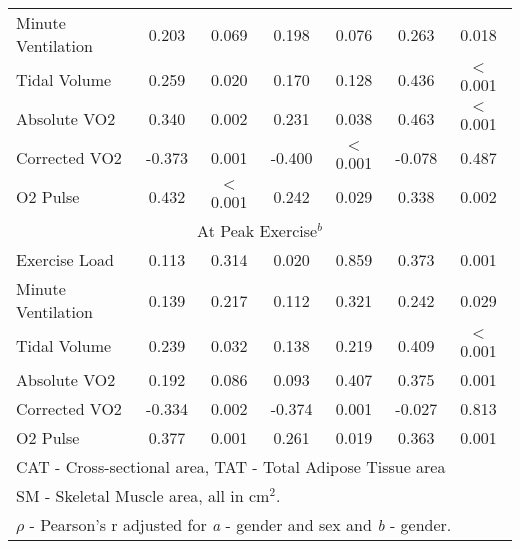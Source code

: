\begin{table}[p]
\begin{tabular}{l | c c | c c | c c}
		Minute Ventilation & 0.203  & 0.069          & 0.198  & 0.076          & 0.263  & 0.018                    \\
		Tidal Volume       & 0.259  & 0.020          & 0.170  & 0.128          & 0.436  & $<$0.001                 \\
		Absolute VO2       & 0.340  & 0.002          & 0.231  & 0.038          & 0.463  & $<$0.001                 \\
		Corrected VO2      & -0.373 & 0.001          & -0.400 & $<$0.001       & -0.078 & 0.487                    \\
		O2 Pulse           & 0.432  & $<$0.001       & 0.242  & 0.029          & 0.338  & 0.002                    \\ \hline
		                                 \multicolumn{7}{c}{At Peak Exercise$^b$}                                  \\ \hline
		Exercise Load      & 0.113  & 0.314          & 0.020  & 0.859          & 0.373  & 0.001                    \\
		Minute Ventilation & 0.139  & 0.217          & 0.112  & 0.321          & 0.242  & 0.029                    \\
		Tidal Volume       & 0.239  & 0.032          & 0.138  & 0.219          & 0.409  & $<$0.001                 \\
		Absolute VO2       & 0.192  & 0.086          & 0.093  & 0.407          & 0.375  & 0.001                    \\
		Corrected VO2      & -0.334 & 0.002          & -0.374 & 0.001          & -0.027 & 0.813                    \\
		O2 Pulse           & 0.377  & 0.001          & 0.261  & 0.019          & 0.363  & 0.001                    \\ \hline
		\multicolumn{7}{l}{CAT - Cross-sectional area, TAT - Total Adipose Tissue area}                            \\
		\multicolumn{7}{l}{SM - Skeletal Muscle area, all in cm$^2$.}                                              \\
		\multicolumn{7}{l}{$\rho$ - Pearson's r adjusted for \textit{a} - gender and sex and \textit{b} - gender.}
	\end{tabular}
\end{table}